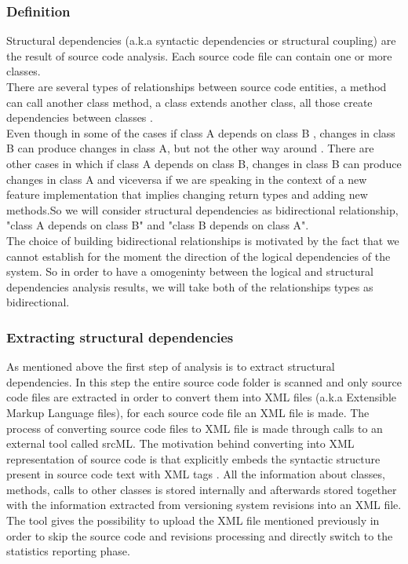 \documentclass[conference,compsoc]{IEEEtran}
\begin{document}
\subsubsection{ Definition }
Structural dependencies (a.k.a syntactic dependencies or structural coupling) are the result of source code analysis. Each source code file can contain one or more classes. \\There are several types of relationships between source code entities, a method can call another class method, a class extends another class, all those create dependencies between classes \cite{ct4}.\\ Even though in some of the cases if class A depends on class B , changes in class B can produce changes in class A, but not the other way around \cite{ct5} . There are other cases in which if class A depends on class B,  changes in class B can produce changes in class A and viceversa if we are speaking in the context of a new feature implementation that implies changing return types and adding new methods.So we will consider structural dependencies as bidirectional relationship, "class A depends on class B" and "class B depends on class A". \\The choice of building bidirectional relationships is motivated by the fact that we cannot establish for the moment the direction of the logical dependencies of the system. So in order to have a omogeninty between the logical and structural dependencies analysis results, we will take both of the relationships types as bidirectional. 
\subsubsection{ Extracting structural dependencies }
As mentioned above the first step of analysis is to extract structural dependencies. In this step the entire source code folder is scanned and only source code files are extracted in order to convert them into XML files (a.k.a  Extensible Markup Language files), for each source code file an XML file is made. The process of converting source code files to XML file is made through calls to an external tool called srcML. The motivation behind converting into XML representation of source code is that explicitly embeds the syntactic structure present in source code text with XML tags \cite{ct9}. All the information about classes, methods, calls to other classes is stored internally and afterwards stored together with the information extracted from versioning system revisions into an XML file. The tool gives the possibility to upload the XML file mentioned previously in order to skip the source code and revisions processing and directly switch to the statistics reporting phase.
\end{document}
